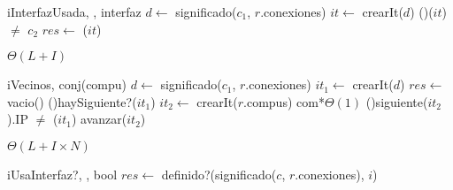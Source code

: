 \begin{Algoritmos}
  \nuevoAlgo
  \begin{algoritmo}{iInterfazUsada}{, , }{interfaz}{}
     $d \gets$ significado($c_1$, $r$.conexiones) 
     $it \gets$ crearIt($d$) 
    \While(){\sigSignif($it$) $\neq$ $c_2$}{
       
    }
    $res \gets$ \sigClave($it$) 
  \end{algoritmo}  
  \datosAlgoritmo{} %
  {} %
  {} %
  {$\Theta(L+I)$} %
  {} %
    
  \begin{algoritmo}{iVecinos}{, }{conj(compu)}{}
     $d \gets$ significado($c_1$, $r$.conexiones) 
     $it_1 \gets$ crearIt($d$) 
    $res \gets$ vacio() 
    \While(){haySiguiente?($it_1$)}{
       $it_2 \gets$ crearIt($r$.compus) com*{$\Theta(1)$}
      \While(){siguiente($it_2$).IP $\neq$ \sigClave($it_1$)}{
        avanzar($it_2$)
      }
     } 
  \end{algoritmo}
  \datosAlgoritmo{} %
  {} %
  {} %
  {$\Theta(L+I \times N)$} %
  {} %
  


  \begin{algoritmo}{iUsaInterfaz?}{, , }{bool}{}
    $res \gets$ definido?(significado($c$, $r$.conexiones), $i$) 
  \end{algoritmo} \datosAlgoritmo{} %
  {} %
  {} %
  {} %
  {} %
   

\end{Algoritmos}
